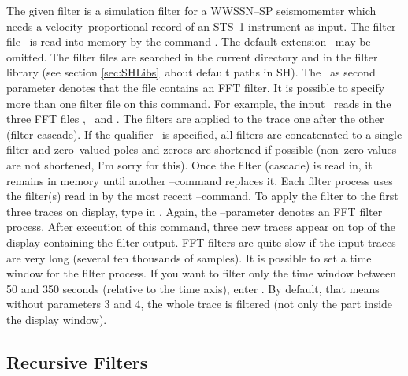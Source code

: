 The given filter is a simulation filter for a WWSSN--SP seismomemter
which needs a velocity--proportional record of an STS--1 instrument
as input.  The filter file \ is read into memory
by the command .  The default extension
\ may be omitted.  The filter files are searched in
the current directory and in the filter library (see section
\ref{sec:SHLibs}\ about default paths in SH).  The \ as
second parameter denotes that the file contains an FFT filter.  It
is possible to specify more than one filter file on this command.
For example, the input \ reads in the three
FFT files , \ and .  The
filters are applied to the trace one after the other (filter
cascade).  If the qualifier \ is specified, all
filters are concatenated to a single filter and zero--valued
poles and zeroes are shortened if possible (non--zero values are
not shortened, I'm sorry for this).  Once the filter (cascade) is
read in, it remains in memory until another --command
replaces it.  Each filter process uses the filter(s)
read in by the most recent --command.  To apply the
filter to the first three traces on display, type in
.  Again, the --parameter denotes an FFT
filter process.  After execution of this command, three new traces
appear on top of the display containing the filter output.
FFT filters are quite slow if the input traces are very long
(several ten thousands of samples).  It is possible to set a time
window for the filter process.  If you want to filter only the
time window between 50 and 350 seconds (relative to the time
axis), enter .  By default, that means
without parameters 3 and 4, the whole trace is filtered (not
only the part inside the display window).


\subsection{Recursive Filters}

